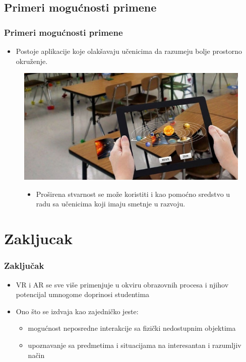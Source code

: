\documentclass[9pt]{beamer}
\begin{document}
 
\subsection{Primeri mogućnosti primene}

 \begin{frame}
 \frametitle{Primeri mogućnosti primene}
            \begin{itemize}
            \setlength\itemsep{1.5em}
		\item Postoje aplikacije koje olakšavaju učenicima da razumeju bolje prostorno okruženje. 
            \end{itemize}
            \begin{figure}[h!]
		\begin{center}
		\includegraphics[scale=0.3]{primer.jpg}
		\end{center}
  \begin{itemize}
		\item Proširena stvarnost se može koristiti i kao pomoćno sredstvo u radu sa učenicima koji imaju smetnje u razvoju.
            \end{itemize}
		
		\end{figure}
\end{frame}
\section{Zakljucak}

\begin{frame}[fragile]\frametitle{Zaključak}
	
		\begin{itemize}
  \setlength\itemsep{1.5em}
			\item VR i AR se sve više primenjuje u okviru obrazovnih procesa i njihov potencijal umnogome doprinosi studentima
			\item Ono što se izdvaja kao zajedničko jeste:
   
   \begin{itemize}
   \item mogućnost neposredne interakcije sa fizički nedostupnim objektima 
    \item upoznavanje sa predmetima i situacijama na interesantan i razumljiv način
   
\end{itemize}

  
		\end{itemize}

\end{frame}
\end{document}
